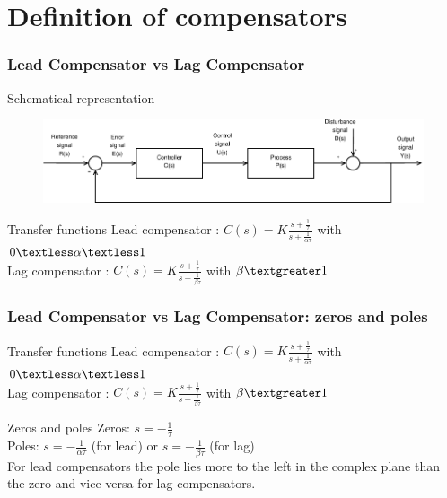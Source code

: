 
\section{Definition of compensators}

\begin{frame}
	\frametitle{Lead Compensator vs Lag Compensator}
	\begin{block}{Schematical representation}
		\begin{figure}
			\centering
			\includegraphics[width=1\linewidth]{Closed-Loop}
		\end{figure}
	\end{block}
	\begin{block}{Transfer functions}
		Lead compensator : 
		$C(s) = K\frac{s + \frac{1}{\tau}}{s + \frac{1}{\alpha\tau}}$ with $0 \textless  \alpha  \textless  1$ \\
		Lag compensator : 
		$C(s) = K\frac{s + \frac{1}{\tau}}{s + \frac{1}{\beta\tau}}$ with $\beta  \textgreater  1$
	\end{block}
\end{frame}

\begin{frame}
\frametitle{Lead Compensator vs Lag Compensator: zeros and poles}
\begin{block}{Transfer functions}
	Lead compensator : 
	$C(s) = K\frac{s + \frac{1}{\tau}}{s + \frac{1}{\alpha\tau}}$ with $0 \textless  \alpha  \textless  1$ \\
	Lag compensator : 
	$C(s) = K\frac{s + \frac{1}{\tau}}{s + \frac{1}{\beta\tau}}$ with $\beta  \textgreater  1$
\end{block}
\begin{block}{Zeros and poles}
	Zeros: $s = -\frac{1}{\tau}$ \\
	\vspace{0.1cm}
	Poles: $s = -\frac{1}{\alpha\tau}$ (for lead) or $s = -\frac{1}{\beta\tau}$ (for lag) \\
	\vspace{0.1cm}
	For lead compensators the pole lies more to the left in the complex plane than the zero and vice versa for lag compensators.
\end{block}
\end{frame}

